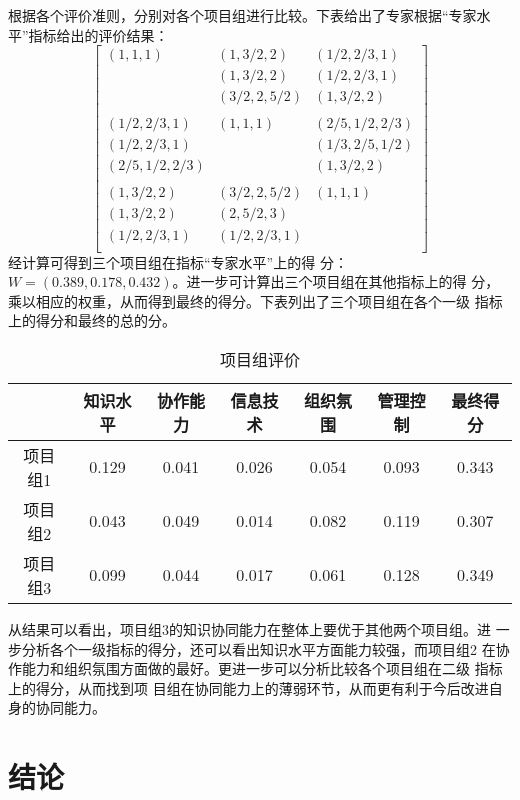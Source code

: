 \documentclass[winfonts,UTF8]{ctexart}
\begin{document}
根据各个评价准则，分别对各个项目组进行比较。下表给出了专家根据“专家水
平”指标给出的评价结果：
\[
\left[
  \begin{array}{lllll}
(1,1,1)&(1,3/2,2)&(1/2,2/3,1)\\
       & (1,3/2,2)&(1/2,2/3,1) \\
       &(3/2,2,5/2)&(1,3/2,2)\\
\\
(1/2,2/3,1)&(1,1,1)&(2/5,1/2,2/3)\\
(1/2,2/3,1)& &(1/3,2/5,1/2)\\
(2/5,1/2,2/3)&&(1,3/2,2)\\
\\
(1,3/2,2)&(3/2,2,5/2)&(1,1,1)\\
(1,3/2,2)&(2,5/2,3)& \\
(1/2,2/3,1)&(1/2,2/3,1)&\\
\end{array}
\right]
\]
经计算可得到三个项目组在指标“专家水平”上的得
分：$W=(0.389,0.178,0.432)$。进一步可计算出三个项目组在其他指标上的得
分，乘以相应的权重，从而得到最终的得分。下表列出了三个项目组在各个一级
指标上的得分和最终的总的分。
\begin{table}[htb]
  \centering
  \caption{项目组评价}
  \begin{tabular}{ccccccc}
\hline
    &知识水平&协作能力&信息技术&组织氛围&管理控制&最终得分\\\hline
项目组1&0.129&0.041&0.026&0.054&0.093&0.343\\
项目组2&0.043&0.049&0.014&0.082&0.119&0.307\\
项目组3&0.099&0.044&0.017&0.061&0.128&0.349\\\hline
  \end{tabular}
\end{table}
从结果可以看出，项目组3的知识协同能力在整体上要优于其他两个项目组。进
一步分析各个一级指标的得分，还可以看出知识水平方面能力较强，而项目组2
在协作能力和组织氛围方面做的最好。更进一步可以分析比较各个项目组在二级
指标上的得分，从而找到项
目组在协同能力上的薄弱环节，从而更有利于今后改进自身的协同能力。

\section{结论}
\end{document}
